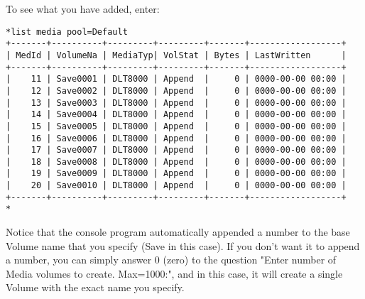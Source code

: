 To see what you have added, enter:

\footnotesize
\begin{verbatim}
*list media pool=Default
+-------+----------+---------+---------+-------+------------------+
| MedId | VolumeNa | MediaTyp| VolStat | Bytes | LastWritten      |
+-------+----------+---------+---------+-------+------------------+
|    11 | Save0001 | DLT8000 | Append  |     0 | 0000-00-00 00:00 |
|    12 | Save0002 | DLT8000 | Append  |     0 | 0000-00-00 00:00 |
|    13 | Save0003 | DLT8000 | Append  |     0 | 0000-00-00 00:00 |
|    14 | Save0004 | DLT8000 | Append  |     0 | 0000-00-00 00:00 |
|    15 | Save0005 | DLT8000 | Append  |     0 | 0000-00-00 00:00 |
|    16 | Save0006 | DLT8000 | Append  |     0 | 0000-00-00 00:00 |
|    17 | Save0007 | DLT8000 | Append  |     0 | 0000-00-00 00:00 |
|    18 | Save0008 | DLT8000 | Append  |     0 | 0000-00-00 00:00 |
|    19 | Save0009 | DLT8000 | Append  |     0 | 0000-00-00 00:00 |
|    20 | Save0010 | DLT8000 | Append  |     0 | 0000-00-00 00:00 |
+-------+----------+---------+---------+-------+------------------+
*
\end{verbatim}
\normalsize

Notice that the console program automatically appended a number to the base
Volume name that you specify (Save in this case). If you don't want it to
append a number, you can simply answer 0 (zero) to the question "Enter number
of Media volumes to create. Max=1000:", and in this case, it will create a
single Volume with the exact name you specify.
